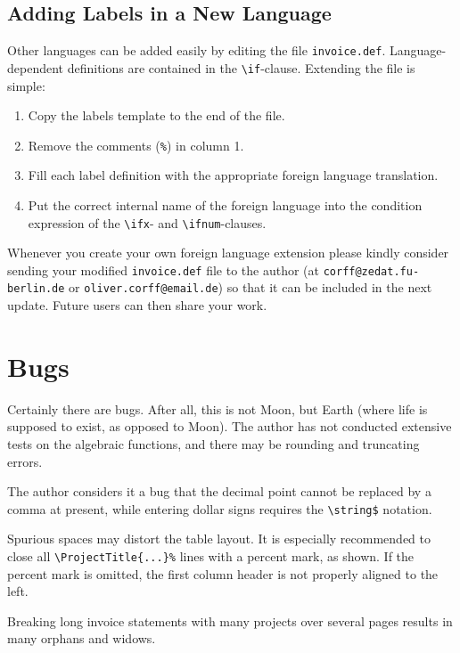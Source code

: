 \documentclass[11pt]{ltxdoc}
\begin{document}
\subsection{Adding Labels in a New Language}

Other languages can be added easily by editing the file
\verb-invoice.def-. Language-dependent definitions are contained in
the \verb-\if--clause. Extending the file is simple: 

\begin{enumerate}
	\item Copy the labels template to the end of the file.
	\item Remove the comments (\verb-%-) in column 1.
	\item Fill each label definition with the appropriate
		foreign language translation.
	\item Put the correct internal name of the foreign language
		into the condition expression of the \verb-\ifx--
		and \verb-\ifnum--clauses.
\end{enumerate}

\begin{sloppypar}
Whenever you create your own foreign language extension please kindly
consider sending your modified \verb-invoice.def- file to the author
(at \verb+corff@zedat.fu-berlin.de+ or \verb+oliver.corff@email.de+)
so that it can be included in the next update. Future users can then
share your work.
\end{sloppypar}

\section{Bugs}

Certainly there are bugs. After all, this is not Moon, but Earth
(where life is supposed to exist, as opposed to Moon). The author 
has not conducted extensive tests on the algebraic functions, and
there may be rounding and truncating errors.

The author considers it a bug that the decimal point cannot be
replaced by a comma at present, while entering dollar signs
requires the \verb|\string$| notation.

Spurious spaces may distort the table layout. It is especially
recommended to close all \verb"\ProjectTitle{...}%" lines with a
percent mark, as shown. If the percent mark is omitted, the first
column header is not properly aligned to the left.

Breaking long invoice statements with many projects over several
pages results in many orphans and widows.
\end{document}
